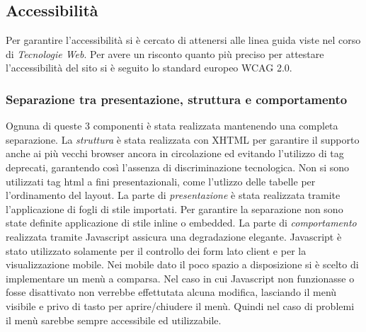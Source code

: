 \subsection{Accessibilità}
Per garantire l'accessibilità si è cercato di attenersi alle linea guida viste nel corso di \textit{Tecnologie Web}. Per avere un risconto quanto più preciso per attestare l'accessibilità del sito si è seguito lo standard europeo WCAG 2.0.
\subsubsection{Separazione tra presentazione, struttura e comportamento}
Ognuna di queste 3 componenti è stata realizzata mantenendo una completa separazione. 
La \textit{struttura} è stata realizzata con XHTML per garantire il supporto anche ai più vecchi browser ancora in circolazione ed evitando l'utilizzo di tag deprecati, garantendo così l'assenza di discriminazione tecnologica.
Non si sono utilizzati tag html a fini presentazionali, come l'utlizzo delle tabelle per l'ordinamento del layout.
La parte di \textit{presentazione} è stata realizzata tramite l'applicazione di fogli di stile importati. Per garantire la separazione non sono state definite applicazione di stile inline o embedded.
La parte di \textit{comportamento} realizzata tramite Javascript assicura una degradazione elegante. Javascript è stato utilizzato solamente per il controllo dei form lato client e per la visualizzazione mobile. Nei mobile dato il poco spazio a disposizione si è scelto di implementare un menù a comparsa. Nel caso in cui Javascript non funzionasse o fosse disattivato non verrebbe effettutata alcuna modifica, lasciando il menù visibile e privo di tasto per aprire/chiudere il menù. Quindi nel caso di problemi il menù sarebbe sempre accessibile ed utilizzabile.
